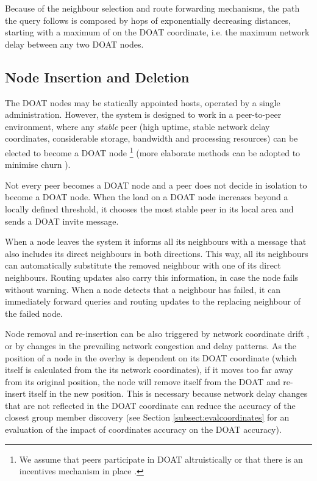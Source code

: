 Because of the neighbour selection and route forwarding mechanisms, the
path the query follows is composed by hops of exponentially decreasing
distances, starting with a maximum of  on the DOAT coordinate, i.e.
the maximum network delay between any two DOAT nodes.




\subsection{Node Insertion and Deletion}

The DOAT nodes may be statically appointed hosts, operated by a single
administration. However, the system is designed to work in a peer-to-peer
environment, where any \emph{stable} peer (high uptime, stable network
delay coordinates, considerable storage, bandwidth and processing
resources) can be elected to become a DOAT node
\footnote{We assume that
peers participate in DOAT altruistically or that there is an
incentives mechanism in place \cite{Incentives}.}
(more elaborate methods can be adopted to minimise
churn \cite{godfrey}).

Not every peer becomes a DOAT node and a peer does not decide in isolation
to become a DOAT node. When the load on a DOAT
node increases 
beyond a
locally defined threshold, it chooses the most stable peer in its local
area and sends a
DOAT invite message.


When a node leaves the system
it informs all its neighbours with a message that also includes its
direct neighbours in both directions. This way, all its neighbours can automatically
substitute the removed neighbour with one of its direct neighbours.
Routing updates also carry this information, in case the node fails without
warning. When a node detects that a neighbour has failed, it can
immediately forward queries and routing updates to the 
replacing neighbour of the failed node.

Node removal and re-insertion can be also triggered by network coordinate
drift \cite{wild}, or by changes in the prevailing network congestion and
delay patterns. As the position of a node in the overlay is dependent on
its DOAT coordinate (which itself is calculated from the its network
coordinates), if it moves too far away from its original position, the node
will remove itself from the DOAT and re-insert itself in the new position.
This is necessary because network delay changes that are not reflected in the
DOAT coordinate can reduce the accuracy of the closest group
member discovery (see Section \ref{subsect:evalcoordinates} for an evaluation of the
impact of coordinates accuracy on the DOAT accuracy).